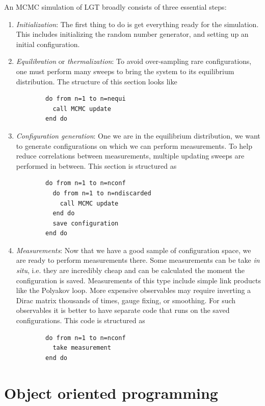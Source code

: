 An MCMC simulation of LGT broadly consists of three essential steps:
\begin{enumerate}
  \item {\it Initialization}: The first thing to do is get everything ready for
        the simulation. This includes initializing the random number generator,
        and setting up an initial configuration.
  \item {\it Equilibration} or {\it thermalization}:
        To avoid over-sampling rare configurations,
        one must perform many sweeps to bring the system to its equilibrium 
        distribution. The structure of this section looks like 
        \begin{verbatim}
        do from n=1 to n=nequi 
          call MCMC update
        end do
        \end{verbatim}
  \item {\it Configuration generation}: One we are in the equilibrium
        distribution, we want to generate configurations on which we can
        perform measurements. To help reduce correlations between
        measurements, multiple updating sweeps are performed in between.
        This section is structured as
        \begin{verbatim}
        do from n=1 to n=nconf
          do from n=1 to n=ndiscarded
            call MCMC update
          end do
          save configuration 
        end do
        \end{verbatim}
  \item {\it Measurements}: Now that we have a good sample of configuration
        space, we are ready to perform measurements there. Some measurements
        can be take {\it in situ}, i.e. they are incredibly cheap and can be
        calculated the moment the configuration is saved. Measurements of this
        type include simple link products like the Polyakov loop. More expensive
        observables may require inverting a Dirac matrix thousands of times, 
        gauge fixing, or smoothing. For such observables it is better to
        have separate code that runs on the saved configurations. This
        code is structured as
        \begin{verbatim}
        do from n=1 to n=nconf
          take measurement 
        end do
        \end{verbatim}
\end{enumerate}

\section{Object oriented programming}


